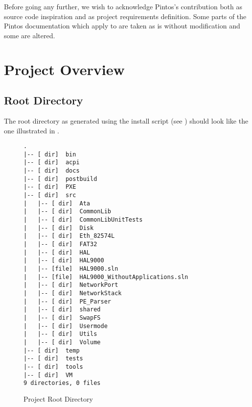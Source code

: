 Before going any further, we wish to acknowledge Pintos's contribution both as source code
inspiration and as project requirements definition. Some parts of the Pintos documentation which
apply to \projectname are taken as is without modification and some are altered.

\section{Project Overview}

\subsection{Root Directory}

The root directory as generated using the install script (see ) should look
like the one illustrated in .

\begin{figure}
\begin{verbatim}
.
|-- [ dir]  bin
|-- [ dir]  acpi
|-- [ dir]  docs
|-- [ dir]  postbuild
|-- [ dir]  PXE
|-- [ dir]  src
|   |-- [ dir]  Ata
|   |-- [ dir]  CommonLib
|   |-- [ dir]  CommonLibUnitTests
|   |-- [ dir]  Disk
|   |-- [ dir]  Eth_82574L
|   |-- [ dir]  FAT32
|   |-- [ dir]  HAL
|   |-- [ dir]  HAL9000
|   |-- [file]  HAL9000.sln
|   |-- [file]  HAL9000_WithoutApplications.sln
|   |-- [ dir]  NetworkPort
|   |-- [ dir]  NetworkStack
|   |-- [ dir]  PE_Parser
|   |-- [ dir]  shared
|   |-- [ dir]  SwapFS
|   |-- [ dir]  Usermode
|   |-- [ dir]  Utils
|   |-- [ dir]  Volume
|-- [ dir]  temp
|-- [ dir]  tests
|-- [ dir]  tools
|-- [ dir]  VM
9 directories, 0 files
\end{verbatim}
\caption{Project Root Directory}
\label{fig:ProjectRoot}
\end{figure}

